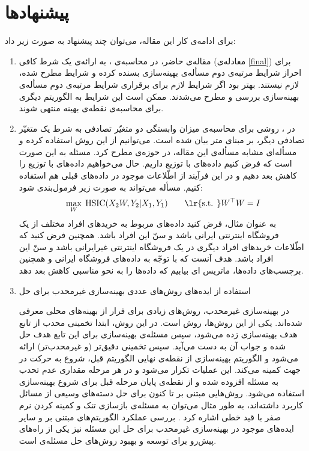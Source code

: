 
\chapter{پیشنهاد‌ها}

برای ادامه‌ی کار این مقاله، می‌توان چند پیشنهاد به صورت زیر داد:
\begin{enumerate}
	\item 
	مقاله‌ی حاضر، در محاسبه‌ی
	،
	به ارائه‌ی یک شرط کافی (معادله‌ی 
	\ref{final})
	برای احراز شرایط مرتبه‌ی دوم مسأله‌ی بهینه‌سازی بسنده کرده و شرایط مطرح‌ شده، لازم نیستند. بهتر بود اگر شرایط لازم برای برقراری شرایط مرتبه‌ی دوم مسأله‌ی بهینه‌سازی بررسی و مطرح می‌شدند. ممکن است این شرایط به الگوریتم دیگری برای محاسبه‌ی نقطه‌ی بهینه منتهی شوند.
	\item 
	در
	\cite{zhang2012kernel}،
	روشی برای محاسبه‌ی میزان وابستگی دو متغیّر تصادفی به شرط یک متغیّر تصادفی دیگر، بر مبنای متر 
	بیان شده است. می‌توانیم از این روش استفاده کرده و مسأله‌ای مشابه مسأله‌ی این مقاله، در حوزه‌ی 
	مطرح کرد. مسئله به این صورت است که فرض کنیم داده‌های
	 با توزیع
	داریم. حال می‌خواهیم داده‌های
	 با توزیع
	را کاهش بعد دهیم و در این فرآیند از اطّلاعات موجود در داده‌های قبلی هم استفاده کنیم. مسأله می‌تواند به صورت زیر فرمول‌بندی شود:
	\[\max_{W} \;\HSIC(X_2W,Y_2|X_1,Y_1)\qquad \text{\lr{s.t. }} W^\top W = I\]
	به عنوان مثال، فرض کنید 
	داده‌های مربوط به خریدهای افراد مختلف از یک فروشگاه اینترنتی ایرانی باشد و 
	سنّ این افراد باشد. همچنین فرض کنید که 
	اطّلاعات خریدهای افراد دیگری در یک فروشگاه اینترنتی غیرایرانی باشد و 
	سنّ این افراد باشد. هدف آنست که با توجّه به داده‌های فروشگاه ایرانی و همچنین برچسب‌های داده‌ها، ماتریس
	ای
	بیابیم که داده‌ها را به نحو مناسبی کاهش بعد دهد.
	
\item 
استفاده از ایده‌های روش‌های عددی بهینه‌سازی غیرمحدب برای حل 
   
   در بهینه‌‌سازی غیرمحدب، روش‌های زیادی برای فرار از بهینه‌های محلی معرفی شده‌اند. یکی از این روش‌ها، روش 
   است. در این روش، ابتدا تخمینی محدب از تابع هدف بهینه‌سازی زده می‌شود، سپس مسئله‌ی بهینه‌سازی برای این تابع هدف حل شده و جواب آن به دست می‌آید. سپس تخمینی دقیق‌تر (و غیرمحدب‌تر) ارائه می‌شود و الگوریتم بهینه‌سازی از نقطه‌ی نهایی الگوریتم قبل، شروع به حرکت در جهت کمینه می‌کند. این عملیات تکرار می‌شود و در هر مرحله مقداری عدم تحدب به مسئله افزوده شده و از نقطه‌ی پایان مرحله قبل برای شروع بهینه‌سازی استفاده می‌شود. روش‌هایی مبتنی بر 
      تا کنون برای حل دسته‌های وسیعی از مسائل کاربرد داشته‌اند، به طور مثال می‌توان به مسئله‌ی بازسازی تنک و کمینه کردن نرم صفر با قید‌ خطی اشاره کرد 
   \cite{SL0}.
   بررسی عملکرد الگوریتم‌‌های مبتنی بر 
      و سایر ایده‌های موجود در بهینه‌سازی غیرمحدب برای حل این مسئله نیز یکی از راه‌های پیش‌رو برای توسعه و بهبود روش‌های حل مسئله‌ی 
      است.

\end{enumerate}
